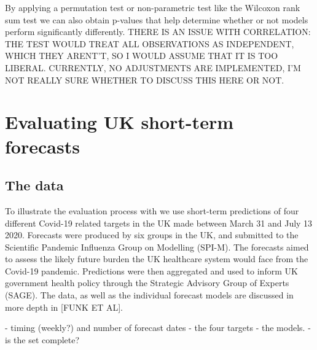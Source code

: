 \documentclass[article]{jss}
\begin{document}
By applying a permutation test or non-parametric test like the Wilcoxon rank sum test we can also obtain p-values that help determine whether or not models perform significantly differently. THERE IS AN ISSUE WITH CORRELATION: THE TEST WOULD TREAT ALL OBSERVATIONS AS INDEPENDENT, WHICH THEY ARENT'T, SO I WOULD ASSUME THAT IT IS TOO LIBERAL. CURRENTLY, NO ADJUSTMENTS ARE IMPLEMENTED, I'M NOT REALLY SURE WHETHER TO DISCUSS THIS HERE OR NOT. 


\section{Evaluating UK short-term forecasts}
\subsection{The data}

To illustrate the evaluation process with  we use short-term predictions of four different Covid-19 related targets in the UK made between March 31 and July 13 2020. Forecasts were produced by six groups in the UK, and submitted to the Scientific Pandemic Influenza Group on Modelling (SPI-M). The forecasts aimed to assess the likely future burden the UK healthcare system would face from the Covid-19 pandemic. Predictions were then aggregated and used to inform UK government health policy through the Strategic Advisory Group of Experts (SAGE). The data, as well as the individual forecast models are discussed in more depth in [FUNK ET AL]. 

- timing (weekly?) and number of forecast dates
- the four targets
- the models. 
- is the set complete?
\end{document}
